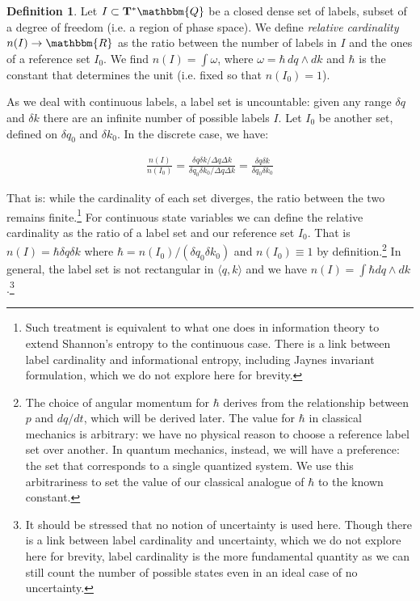 \documentclass[aps,pra,10pt,twocolumn,floatfix,nofootinbib]{revtex4-1}
\theoremstyle{definition}
\newtheorem{defn}[thm]{Definition}
\begin{document}
\begin{defn}\label{relativeCardinality}
Let $I \subset \mathbf{T}^*\mathbbm{Q}$ be a closed dense set of labels, subset of a degree of freedom (i.e. a region of phase space). We define \emph{relative cardinality} $n(I) \rightarrow \mathbbm{R}$ as the ratio between the number of labels in $I$ and the ones of a reference set $I_0$. We find $n(I)=\int \omega$, where $\omega = \hbar \, dq \wedge dk$ and $\hbar$ is the constant that determines the unit (i.e. fixed so that $n(I_0) = 1$).
\end{defn}

As we deal with continuous labels, a label set is uncountable: given any range $\delta q$ and $\delta k$ there are an infinite number of possible labels $I$. Let $I_0$ be another set, defined on $\delta q_0$ and $\delta k_0$. In the discrete case, we have:

\begin{align*}
\frac{n(I)}{n(I_0)} = \frac{\delta q \delta k / \Delta q \Delta k}{\delta q_0 \delta k_0 / \Delta q \Delta k} = \frac{\delta q \delta k}{\delta q_0 \delta k_0}
\end{align*}

That is: while the cardinality of each set diverges, the ratio between the two remains finite.\footnote{Such treatment is equivalent to what one does in information theory to extend Shannon's entropy\cite{Shannon} to the continuous case. There is a link between label cardinality and informational entropy, including Jaynes\cite{Jaynes} invariant formulation, which we do not explore here for brevity.} For continuous state variables we can define the relative cardinality as the ratio of a label set and our reference set $I_0$. That is $n(I)=\hbar \delta q \delta k$ where $\hbar=n(I_0)/(\delta q_0 \delta k_0)$ and $n(I_0)\equiv1$ by definition.\footnote{The choice of angular momentum for $\hbar$ derives from the relationship between $p$ and $dq/dt$, which will be derived later. The value for $\hbar$ in classical mechanics is arbitrary: we have no physical reason to choose a reference label set over another. In quantum mechanics, instead, we will have a preference: the set that corresponds to a single quantized system. We use this arbitrariness to set the value of our classical analogue of $\hbar$ to the known constant.} In general, the label set is not rectangular in $\langle q,k \rangle$ and we have $n(I)=\int \hbar dq \wedge dk$.\footnote{It should be stressed that no notion of uncertainty is used here. Though there is a link between label cardinality and uncertainty, which we do not explore here for brevity, label cardinality is the more fundamental quantity as we can still count the number of possible states even in an ideal case of no uncertainty.}
\end{document}
